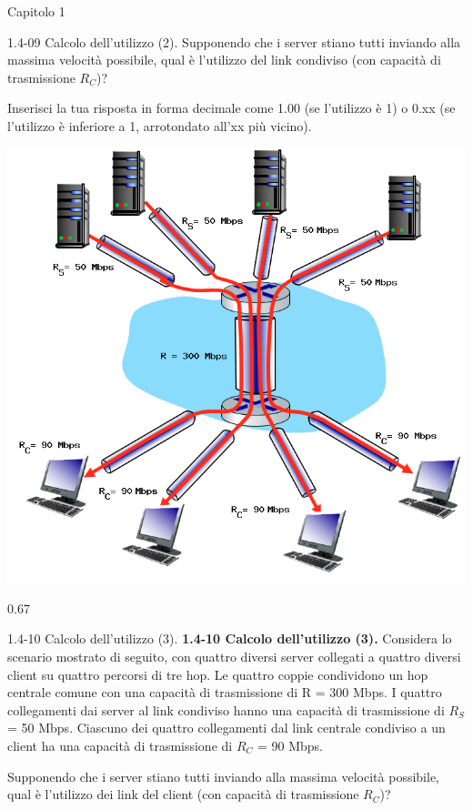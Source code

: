 \documentclass[a4paper]{article}
\begin{document}
\begin{quiz}{Capitolo 1}
\begin{shortanswer}[points=1]{1.4-09 Calcolo dell'utilizzo (2).}
Supponendo che i server stiano tutti inviando alla massima velocità possibile, qual è l'utilizzo del link condiviso (con capacità di trasmissione $R_C$)? 

Inserisci la tua risposta in forma decimale come 1.00 (se l'utilizzo è 1) o 0.xx (se l'utilizzo è inferiore a 1, arrotondato all'xx più vicino). 

\begin{center}
\includegraphics[width=\linewidth]{figs/1.4.7.png}
\end{center}
\item* 0.67
\end{shortanswer}


\begin{shortanswer}[points=1]{1.4-10 Calcolo dell'utilizzo (3).}
\textbf{1.4-10 Calcolo dell'utilizzo (3).} 
Considera lo scenario mostrato di seguito, con quattro diversi server collegati a quattro diversi client su quattro percorsi di tre hop. Le quattro coppie condividono un hop centrale comune con una capacità di trasmissione di R = 300 Mbps. I quattro collegamenti dai server al link condiviso hanno una capacità di trasmissione di $R_S$ = 50 Mbps. Ciascuno dei quattro collegamenti dal link centrale condiviso a un client ha una capacità di trasmissione di $R_C$ = 90 Mbps. 

Supponendo che i server stiano tutti inviando alla massima velocità possibile, qual è l'utilizzo dei link del client (con capacità di trasmissione $R_C$)? 


\end{shortanswer}
\end{quiz}
\end{document}
